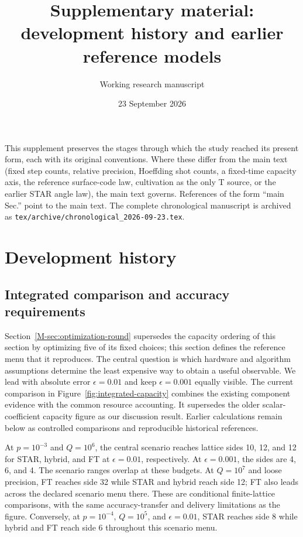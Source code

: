 \documentclass[11pt]{article}
\title{Supplementary material:\\development history and earlier reference models}
\author{Working research manuscript}
\date{23 September 2026}
\newcommand{\eps}{\epsilon}
\begin{document}
\maketitle
This supplement preserves the stages through which the study reached its present form, each with its original conventions. Where these differ from the main text (fixed step counts, relative precision, Hoeffding shot counts, a fixed-time capacity axis, the reference surface-code law, cultivation as the only T source, or the earlier STAR angle law), the main text governs. References of the form ``main Sec.'' point to the main text. The complete chronological manuscript is archived as \texttt{tex/archive/chronological\_2026-09-23.tex}.

\section{Development history}\label{sup:history}
\subsection{Integrated comparison and accuracy requirements}\label{sec:integrated}
Section~\ref{M-sec:optimization-round} supersedes the capacity ordering of this
section by optimizing five of its fixed choices; this section defines the
reference menu that it reproduces.
The central question is which hardware and algorithm assumptions determine
the least expensive way to obtain a useful observable. We lead with absolute
error $\eps=0.01$ and keep $\eps=0.001$ equally visible. The current comparison
in Figure~\ref{fig:integrated-capacity} combines the existing component evidence
with the common resource accounting. It supersedes the older scalar-coefficient
capacity figure as our discussion result. Earlier calculations remain below
as controlled comparisons and reproducible historical references.

At $p=10^{-3}$ and $Q=10^6$, the central scenario reaches lattice sides
10, 12, and 12 for STAR, hybrid, and FT at $\eps=0.01$, respectively.
At $\eps=0.001$, the sides are 4, 6, and 4. The scenario ranges overlap
at these budgets. At $Q=10^7$ and loose precision, FT reaches side 32
while STAR and hybrid reach side 12; FT also leads across the declared
scenario menu there. These are conditional finite-lattice comparisons,
with the same accuracy-transfer and delivery limitations as the figure.
Conversely, at $p=10^{-4}$, $Q=10^5$, and $\eps=0.01$, STAR reaches
side 8 while hybrid and FT reach side 6 throughout this scenario menu.
\end{document}
